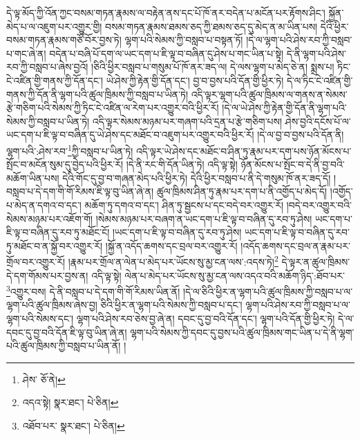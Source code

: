 དེ་ལྟ་མོད་ཀྱི་འོན་ཀྱང་བསམ་གཏན་རྣམས་ལ་བརྟེན་ནས་དང་པོ་ཁོ་ནར་བདེན་པ་མངོན་པར་རྟོགས་ཤིང་། སྐྱོན་མེད་པ་ལ་འཇུག་པར་འགྱུར་གྱི། བསམ་གཏན་རྣམས་ཐམས་ཅད་ཀྱི་ཐམས་ཅད་དུ་མེད་ན་མ་ཡིན་པས། དེའི་ཕྱིར་བསམ་གཏན་རྣམས་གཙོ་བོར་བྱས་ཏེ། ལྷག་པའི་སེམས་ཀྱི་བསླབ་པ་བསྟན་ཏོ། །དེ་ལ་ལྷག་པའི་ཤེས་རབ་ཀྱི་བསླབ་པ་གང་ཞེ་ན། བདེན་པ་བཞི་པོ་དག་ལ་ཡང་དག་པ་ཇི་ལྟ་བ་བཞིན་དུ་ཤེས་པ་གང་ཡིན་པ་སྟེ། དེ་ནི་ལྷག་པའི་ཤེས་རབ་ཀྱི་བསླབ་པ་ཞེས་བྱའོ། །ཅིའི་ཕྱིར་བསླབ་པ་གསུམ་པོ་ཁོ་ནར་ཟད་ལ། དེ་ལས་ལྷག་པ་མེད་ཅེ་ན། སྨྲས་པ། ཏིང་ངེ་འཛིན་གྱི་གནས་ཀྱི་དོན་དང་། ཡེ་ཤེས་ཀྱི་རྟེན་གྱི་དོན་དང་། བྱ་བ་བྱས་པའི་དོན་གྱི་ཕྱིར་ཏེ། དེ་ལ་ཏིང་ངེ་འཛིན་གྱི་གནས་ཀྱི་དོན་ནི་ལྷག་པའི་ཚུལ་ཁྲིམས་ཀྱི་བསླབ་པ་ཡིན་ཏེ། འདི་ལྟར་ལྷག་པའི་ཚུལ་ཁྲིམས་ལ་གནས་ན་སེམས་རྩེ་གཅིག་པའི་སེམས་ཀྱི་ཏིང་ངེ་འཛིན་ལ་རེག་པར་འགྱུར་བའི་ཕྱིར་རོ། །དེ་ལ་ཡེ་ཤེས་ཀྱི་རྟེན་གྱི་དོན་ནི་ལྷག་པའི་སེམས་ཀྱི་བསླབ་པ་ཡིན་ཏེ། འདི་ལྟར་སེམས་མཉམ་པར་གཞག་པའི་དྲན་པ་རྩེ་གཅིག་པས། ཤེས་བྱའི་དངོས་པོ་ལ་ཡང་དག་པ་ཇི་ལྟ་བ་བཞིན་དུ་ཡེ་ཤེས་དང་མཐོང་བ་འཇུག་པར་འགྱུར་བའི་ཕྱིར་རོ། །དེ་ལ་བྱ་བ་བྱས་པའི་དོན་ནི། ལྷག་པའི་:ཤེས་རབ་\footnote{ཤེས་  ཅོ་ནེ། }ཀྱི་བསླབ་པ་ཡིན་ཏེ། འདི་ལྟར་ཡེ་ཤེས་དང་མཐོང་བ་ཤིན་ཏུ་རྣམ་པར་དག་པས་ཉོན་མོངས་པ་སྤོང་བ་མངོན་སུམ་དུ་བྱེད་པའི་ཕྱིར་རོ། །དེ་ནི་རང་གི་དོན་ཡིན་ཏེ། འདི་ལྟ་སྟེ། ཉོན་མོངས་པ་སྤོང་བ་དེ་ནི་བྱ་བའི་མཆོག་ཡིན་པས། དེའི་གོང་དུ་བྱ་བ་གཞན་མེད་པའི་ཕྱིར་ཏེ། དེའི་ཕྱིར་བསླབ་པ་ནི་དེ་གསུམ་ཁོ་ནར་ཟད་དོ། །བསླབ་པ་དེ་དག་གི་གོ་རིམས་ཇི་ལྟ་བུ་ཡིན་ཞེ་ན། ཚུལ་ཁྲིམས་ཤིན་ཏུ་རྣམ་པར་དག་པ་ནི་འགྱོད་པ་མེད་དོ། །འགྱོད་པ་མེད་ན་དགའ་བ་དང་། མཆོག་ཏུ་དགའ་བ་དང་། ཤིན་ཏུ་སྦྱངས་པ་དང་བདེ་བར་འགྱུར་རོ། །བདེ་བར་འགྱུར་བའི་སེམས་མཉམ་པར་འཇོག་གོ། །སེམས་མཉམ་པར་བཞག་ན་ཡང་དག་པ་ཇི་ལྟ་བ་བཞིན་དུ་རབ་ཏུ་ཤེས། ཡང་དག་པ་ཇི་ལྟ་བ་བཞིན་དུ་རབ་ཏུ་མཐོང་ངོ། །ཡང་དག་པ་ཇི་ལྟ་བ་བཞིན་དུ་རབ་ཏུ་ཤེས། ཡང་དག་པ་ཇི་ལྟ་བ་བཞིན་དུ་རབ་ཏུ་མཐོང་བ་ན་སྐྱོ་བར་འགྱུར་རོ། །སྐྱོ་ན་འདོད་ཆགས་དང་བྲལ་བར་འགྱུར་རོ། །འདོད་ཆགས་དང་བྲལ་ན་རྣམ་པར་གྲོལ་བར་འགྱུར་རོ། །རྣམ་པར་གྲོལ་ན་ལེན་པ་མེད་པར་ཡོངས་སུ་མྱ་ངན་ལས་:འདས་ཏེ།\footnote{འདའ་སྟེ།  སྣར་ཐང་།  པེ་ཅིན། } དེ་ལྟར་ན་ཚུལ་ཁྲིམས་དེ་དག་གོམས་པར་བྱས་ན། འདི་ལྟ་སྟེ། ལེན་པ་མེད་པར་ཡོངས་སུ་མྱ་ངན་ལས་འདའ་བའི་མཆོག་ཉིད་:ཐོབ་པར་\footnote{འཐོབ་པར་  སྣར་ཐང་།  པེ་ཅིན། }འགྱུར་བས། དེ་ནི་བསླབ་པ་དེ་དག་གི་གོ་རིམས་ཡིན་ནོ། །དེ་ལ་ཅིའི་ཕྱིར་ན་ལྷག་པའི་ཚུལ་ཁྲིམས་ཀྱི་བསླབ་པ་ལ་ལྷག་པའི་ཚུལ་ཁྲིམས་ཞེས་བྱ། ཅིའི་ཕྱིར་ན་ལྷག་པའི་སེམས་ཀྱི་བསླབ་པ་དང་། ལྷག་པའི་ཤེས་རབ་ཀྱི་བསླབ་པ་ལ་ལྷག་པའི་སེམས་དང་། ལྷག་པའི་ཤེས་རབ་ཅེས་བྱ་ཞེ་ན། དབང་དུ་བྱ་བའི་དོན་དང་། ལྷག་པའི་དོན་གྱི་ཕྱིར་ཏེ། དེ་ལ་དབང་དུ་བྱ་བའི་དོན་ཇི་ལྟ་བུ་ཡིན་ཞེ་ན། ལྷག་པའི་སེམས་ཀྱི་དབང་དུ་བྱས་པའི་ཚུལ་ཁྲིམས་གང་ཡིན་པ་དེ་ནི་ལྷག་པའི་ཚུལ་ཁྲིམས་ཀྱི་བསླབ་པ་ཡིན་ནོ། །
